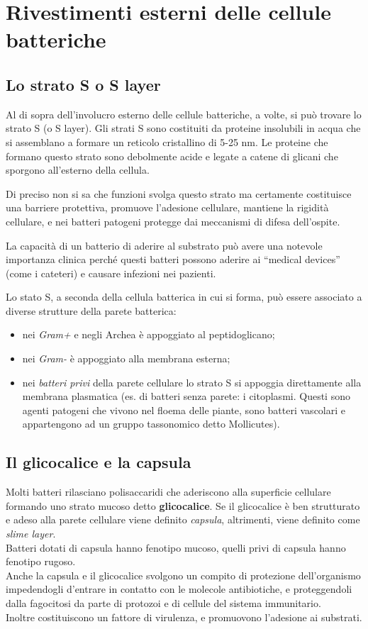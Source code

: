 \documentclass[11pt]{book}
\begin{document}
\section{Rivestimenti esterni delle cellule batteriche}
\subsection{Lo strato S o S layer}

Al di sopra dell’involucro esterno delle cellule batteriche, a volte, si può trovare lo strato S (o S layer).
Gli strati S sono costituiti da proteine insolubili in acqua che si assemblano a formare un reticolo cristallino di 5-25 nm. Le proteine che formano questo strato sono debolmente acide e legate a catene di glicani che sporgono all’esterno della cellula.

Di preciso non si sa che funzioni svolga questo strato ma certamente costituisce una barriere protettiva, promuove l’adesione cellulare, mantiene la rigidità cellulare, e nei batteri patogeni protegge dai meccanismi di difesa dell’ospite.

La capacità di un batterio di aderire al substrato può avere una notevole importanza clinica perché questi batteri possono aderire ai “medical devices” (come i cateteri) e causare infezioni nei pazienti.

\vspace{1em}
Lo stato S, a seconda della cellula batterica in cui si forma, può essere associato a diverse strutture della parete batterica:
\begin{itemize}
\item nei \emph{Gram+} e negli Archea è appoggiato al peptidoglicano;
\item nei \emph{Gram-} è appoggiato alla membrana esterna;
\item nei \emph{batteri privi} della parete cellulare lo strato S si appoggia direttamente alla membrana plasmatica (es. di batteri senza parete: i citoplasmi. Questi sono agenti patogeni che vivono nel floema delle piante, sono batteri vascolari e appartengono ad un gruppo tassonomico detto Mollicutes).
\end{itemize}
 
\subsection{Il glicocalice e la capsula}

Molti batteri rilasciano polisaccaridi che aderiscono alla superficie cellulare formando uno strato mucoso detto \textbf{glicocalice}. 
Se il glicocalice è ben strutturato e adeso alla parete cellulare viene definito \emph{capsula}, altrimenti, viene definito come \emph{slime layer}.\\ 
Batteri dotati di capsula hanno fenotipo mucoso, quelli privi di capsula hanno fenotipo rugoso.\\
Anche la capsula e il glicocalice svolgono un compito di protezione dell’organismo impedendogli d’entrare in contatto con le molecole antibiotiche, e proteggendoli dalla fagocitosi da parte di protozoi e di cellule del sistema immunitario.\\
Inoltre costituiscono un fattore di virulenza, e promuovono l’adesione ai substrati.
\end{document}
